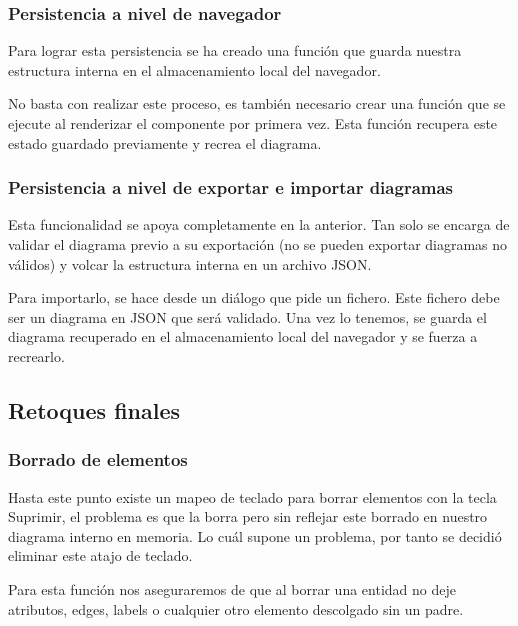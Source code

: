 \subsubsection{Persistencia a nivel de navegador}
Para lograr esta persistencia se ha  creado una función que guarda nuestra estructura interna en el almacenamiento local del navegador.


No basta con realizar este proceso, es también necesario crear una función que se ejecute al renderizar el componente por primera vez. Esta función recupera este estado guardado previamente y recrea el diagrama.

\subsubsection{Persistencia a nivel de exportar e importar diagramas}
Esta funcionalidad se apoya completamente en la anterior. Tan solo se encarga de validar el diagrama previo a su exportación (no se pueden exportar diagramas no válidos) y volcar la estructura interna en un archivo JSON.

Para importarlo, se hace desde un diálogo que pide un fichero. Este fichero debe ser un diagrama en JSON que será validado. Una vez lo tenemos, se guarda el diagrama recuperado en el almacenamiento local del navegador y  se fuerza a recrearlo.



\subsection{Retoques finales}
\subsubsection{Borrado de elementos}
Hasta este punto existe un mapeo de teclado para borrar elementos con la tecla Suprimir, el problema es que la borra pero sin reflejar este borrado en nuestro diagrama interno en memoria. Lo cuál supone un problema, por tanto se decidió eliminar este atajo de teclado.

Para esta función nos aseguraremos de que al borrar una entidad no deje atributos, edges, labels o cualquier otro elemento descolgado sin un padre.


